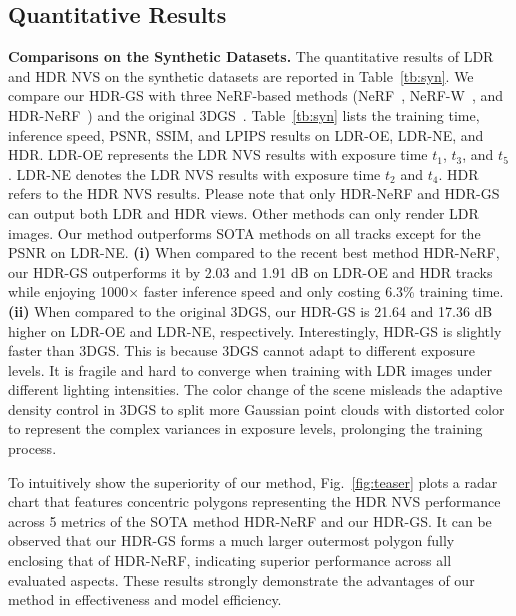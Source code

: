 \documentclass{article}
\begin{document}
\subsection{Quantitative Results}

\noindent \textbf{Comparisons on the Synthetic Datasets.} The quantitative results of LDR and HDR NVS on the synthetic datasets are reported in Table~\ref{tb:syn}. We compare our HDR-GS with three NeRF-based methods (NeRF~\cite{nerf}, NeRF-W~\cite{nerf_w}, and HDR-NeRF~\cite{hdr_nerf}) and the original 3DGS~\cite{3dgs}. Table~\ref{tb:syn} lists the training time, inference speed, PSNR, SSIM, and LPIPS results on LDR-OE, LDR-NE, and HDR. LDR-OE represents the LDR NVS results with exposure time $t_1$, $t_3$, and $t_5$. LDR-NE denotes the LDR NVS results with exposure time $t_2$ and $t_4$. HDR refers to the HDR NVS results. Please note that only HDR-NeRF and HDR-GS can output both LDR and HDR views. Other methods can only render LDR images. Our method outperforms SOTA methods on all tracks except for the PSNR on LDR-NE. \textbf{(i)} When compared to the recent best method HDR-NeRF, our HDR-GS outperforms it by 2.03 and 1.91 dB on LDR-OE and HDR tracks while enjoying 1000$\times$ faster inference speed and only costing 6.3\%  training time. \textbf{(ii)} When compared to the original 3DGS, our HDR-GS is 21.64 and 17.36 dB higher on LDR-OE and LDR-NE, respectively. Interestingly, HDR-GS is slightly faster than  3DGS. This is because 3DGS cannot adapt to different exposure levels. It is fragile and hard to converge when training with LDR images under different lighting intensities. The color change of the scene misleads the adaptive density control in 3DGS to split more Gaussian point clouds with distorted color to represent the complex variances in exposure levels, prolonging the training process.

To intuitively show the superiority of our method, Fig.~\ref{fig:teaser} plots a radar chart that features concentric polygons representing the HDR NVS performance across 5 metrics of the SOTA method HDR-NeRF and our HDR-GS. It can be observed that our HDR-GS forms a much larger outermost polygon fully enclosing that of HDR-NeRF, indicating superior performance across all evaluated aspects. These results strongly demonstrate the advantages of our method in effectiveness and model efficiency.
\end{document}
